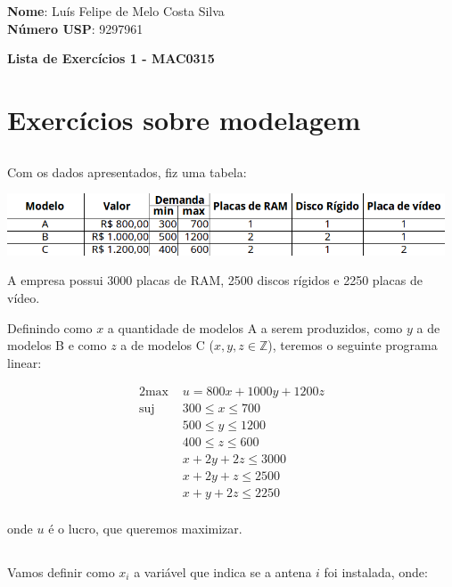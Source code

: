 \documentclass[12pt,letterpaper]{article}
\begin{document}
    \textbf{Nome}: Luís Felipe de Melo Costa Silva \\
    \textbf{Número USP}: 9297961 
        
    \begin{center}
        \LARGE \bf
        Lista de Exercícios 1 - MAC0315
    \end{center}

    \section{Exercícios sobre modelagem}

    \subsection{} Com os dados apresentados, fiz uma tabela:
    
    \begin{center}
	    \includegraphics[width=13cm]{1-1.png}
    \end{center}
    
    A empresa possui 3000 placas de RAM, 2500 discos rígidos e 2250 placas de vídeo.
    
    Definindo como $x$ a quantidade de modelos A a serem produzidos, como $y$ a de modelos B e como $z$ a de modelos C ($x,y,z \in \mathbb{Z}$), teremos o seguinte programa linear:
    
    \begin{alignat*}{2}
	    \text{max  } & u = 800x+1000y+1200z  \\
	    \text{suj  } & 300 \leq x \leq 700\\
	                 & 500 \leq y \leq 1200\\
	                 & 400 \leq z \leq 600\\
	                 & x+2y+2z \leq 3000\\
	                 & x+2y+z \leq 2500\\
	                 & x+y+2z \leq 2250\\
    \end{alignat*}
	
	onde $u$ é o lucro, que queremos maximizar.
	
	\subsection{ } Vamos definir como $x_i$ a variável que indica se a antena $i$ foi instalada, onde:
	
\end{document}
